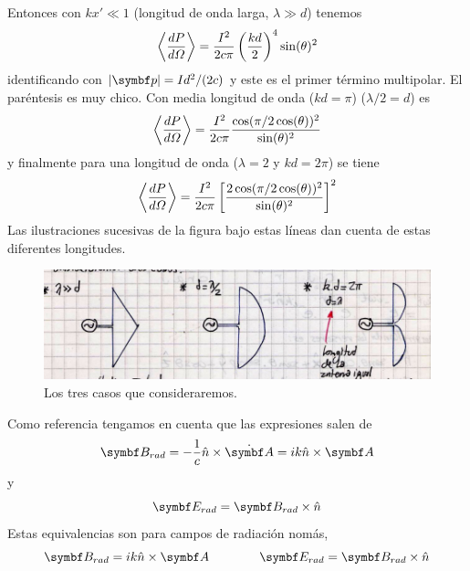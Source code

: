 \documentclass[10pt,oneside]{CBFT_book}
\begin{document}
Entonces con $ kx' \ll 1$ (longitud de onda larga, $\lambda \gg d $) tenemos
\[
	\left\langle\frac{d^{\hspace{-0.05em}} {P}}{d {\Omega}^{\hspace{-0.05em}}}\right\rangle = \frac{I^2}{2c\pi}\left( \frac{kd}{2} \right)^4 
		\sin(\theta)^2
\]
identificando con $|\vb{p}| = Id^2/(2c)$ y este es el primer término multipolar. El paréntesis es muy
chico.
Con media longitud de onda ($kd=\pi$) ($\lambda/2=d$) es
\[
	\left\langle\frac{d^{\hspace{-0.05em}} {P}}{d {\Omega}^{\hspace{-0.05em}}}\right\rangle=\frac{I^2}{2c\pi}\frac{\cos(\pi/2 
	\cos(\theta))^2}{\sin(\theta)^2}
\]
y finalmente para una longitud de onda ($\lambda=2$ y $kd=2\pi$) se tiene 
\[
	\left\langle\frac{d^{\hspace{-0.05em}} {P}}{d {\Omega}^{\hspace{-0.05em}}}\right\rangle=\frac{I^2}{2c\pi} \left[ \frac{ 2\cos(\pi/2 
	\cos(\theta))^2}{\sin(\theta)^2} \right]^2
\]
Las ilustraciones sucesivas de la figura bajo estas líneas dan cuenta de estas diferentes longitudes.

\begin{figure}[htb]
	\begin{center}
	\includegraphics[width=1.0\textwidth]{images/fig_ft1_antena3.jpg}	 
	\end{center}
	\caption{Los tres casos que consideraremos.}
\end{figure} 


Como referencia tengamos en cuenta que las expresiones salen de 
\[
	\vb{B}_{rad} = -\frac{1}{c} \hat{n} \times \dot{\vb{A}} = ik \hat{n} \times \vb{A} 
\]
y
\[
	\vb{E}_{rad} = \vb{B}_{rad} \times \hat{n}
\]
Estas equivalencias son para campos de radiación nomás,
\[
	\vb{B}_{rad} = ik \hat{n} \times \vb{A} \qquad \qquad \vb{E}_{rad} = \vb{B}_{rad} \times \hat{n}
\]
\end{document}
